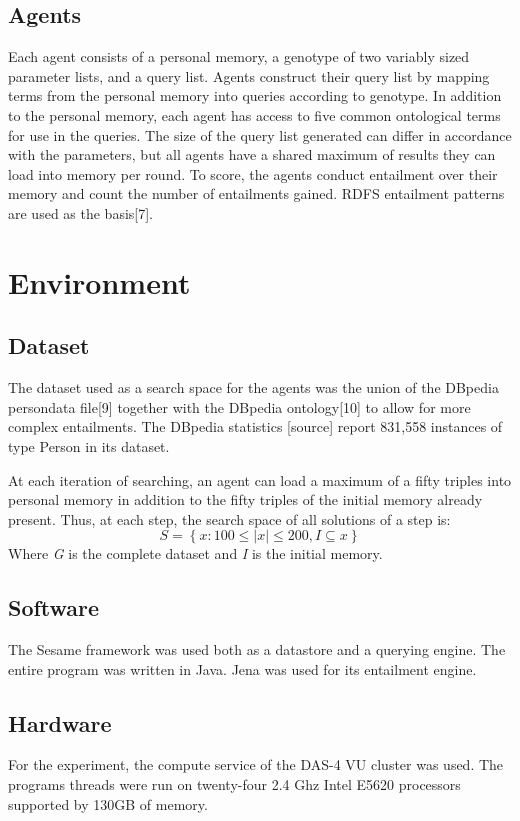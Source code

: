 \documentclass[thesis,12pt]{article}
\begin{document}
\subsection{Agents}
Each agent consists of a personal memory, a genotype of two variably sized parameter lists, and a query list. Agents construct their query list by mapping terms from the personal memory into queries according to genotype. In addition to the personal memory, each agent has access to five common ontological terms for use in the queries. The size of the query list generated can differ in accordance with the parameters, but all agents have a shared maximum of results they can load into memory per round.
To score, the agents conduct entailment over their memory and count the number of entailments gained. RDFS entailment patterns are used as the basis[7].

\section{Environment}

\subsection{Dataset}
The dataset used as a search space for the agents was the union of the DBpedia persondata file[9] together with the DBpedia ontology[10] to allow for more complex entailments. The DBpedia statistics [source] report 831,558 instances of type Person in its dataset. 

At each iteration of searching, an agent can load a maximum of a fifty triples into personal memory in addition to the fifty triples of the initial memory already present. Thus, at each step, the search space of all solutions of a step is:
\begin{equation}
S = \left \{  x : 100 \leq \left | x \right |\leq 200, I\subseteq x\right \}
\end{equation}
Where \textit{G} is the complete dataset and \textit{I} is the initial memory.

\subsection{Software}
The Sesame framework was used both as a datastore and a querying engine. The entire program was written in Java. Jena was used for its entailment engine.

\subsection{Hardware}
For the experiment, the compute service of the DAS-4 VU cluster was used. The programs threads were run on twenty-four 2.4 Ghz Intel E5620 processors supported by 130GB of memory.
\end{document}
